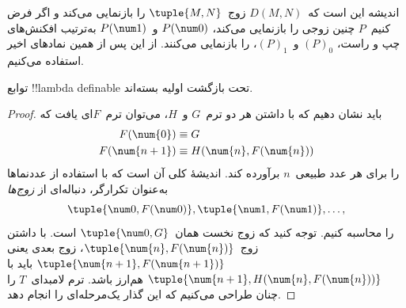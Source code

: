 \documentclass[../../../include/open-logic-section]{subfiles}
\begin{document}
اندیشه این است که~$D(M,N)$ زوج~$\tuple{M, N}$ را بازنمایی می‌کند و اگر
فرض کنیم~$P$ چنین زوجی را بازنمایی می‌کند، $P(\num 0)$ و~$P(\num 1)$
به‌ترتیب افکنش‌های چپ و راست، $(P)_0$ و~$(P)_1$، را بازنمایی می‌کنند.
از این پس از همین نمادهای اخیر استفاده می‌کنیم.

\begin{lem}
توابع !!{lambda definable} تحت بازگشت اولیه بسته‌اند.
\end{lem}

\begin{proof}
باید نشان دهیم که با داشتن هر دو ترم~$G$ و~$H$، می‌توان ترم~$F$ای یافت
که
\begin{align*}
F(\num{0}) & \equiv G \\
F(\num{n+1}) & \equiv H(\num{n}, F(\num{n}))
\end{align*}
را برای هر عدد طبیعی~$n$ برآورده کند. اندیشهٔ کلی آن است که با استفاده
از عددنماها به‌عنوان تکرارگر، دنباله‌ای از \emph{زوج‌ها}
\[
\tuple{\num 0, F(\num 0)}, \tuple{\num 1, F(\num 1)}, \dots,
\]
را محاسبه کنیم. توجه کنید که زوج نخست همان~$\tuple{\num 0, G}$ است.
با داشتن زوج~$\tuple{\num{n}, F(\num{n})}$، زوج بعدی یعنی
$\tuple{\num{n+1}, F(\num{n+1})}$ باید با
$\tuple{\num{n+1}, H(\num{n}, F(\num{n}))}$ هم‌ارز باشد. ترم لامبدای~$T$
را چنان طراحی می‌کنیم که این گذار یک‌مرحله‌ای را انجام دهد.


\end{proof}
\end{document}
